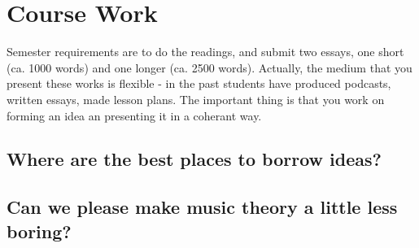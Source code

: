 \documentclass[11pt]{article}
\begin{document}
\section{Course Work}
\label{sec:org106838a}
Semester requirements are to do the readings, and submit two essays,
one short (ca. 1000 words) and one longer (ca. 2500 words). Actually,
the medium that you present these works is flexible - in the past
students have produced podcasts, written essays, made lesson
plans. The important thing is that you work on forming an idea an
presenting it in a coherant way. 

\subsection{Where are the best places to borrow ideas?}
\label{sec:org9087aff}
\subsection{Can we please make music theory a little less boring?}
\label{sec:org7c27050}
\end{document}
